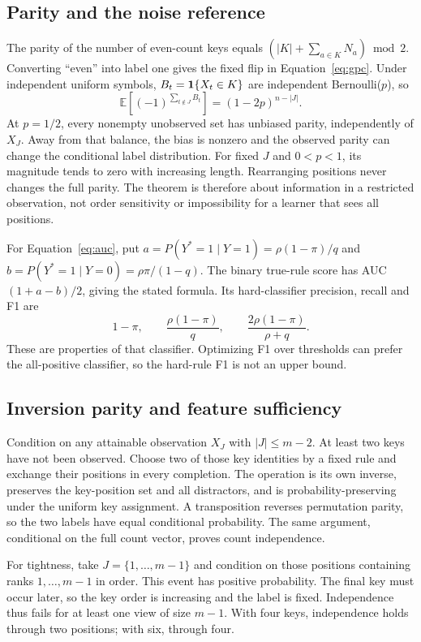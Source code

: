 \subsection{Parity and the noise reference}
The parity of the number of even-count keys equals $(|K|+\sum_{a\in K}N_a)\bmod2$. Converting ``even'' into label one gives the fixed flip in Equation~\ref{eq:gpc}. Under independent uniform symbols, $B_t=\mathbf{1}\{X_t\in K\}$ are independent Bernoulli($p$), so
\[
\mathbb E\!\left[(-1)^{\sum_{t\notin J}B_t}\right]=(1-2p)^{n-|J|}.
\]
At $p=1/2$, every nonempty unobserved set has unbiased parity, independently of $X_J$. Away from that balance, the bias is nonzero and the observed parity can change the conditional label distribution. For fixed $J$ and $0<p<1$, its magnitude tends to zero with increasing length. Rearranging positions never changes the full parity. The theorem is therefore about information in a restricted observation, not order sensitivity or impossibility for a learner that sees all positions.

For Equation~\ref{eq:auc}, put $a=P(Y^*=1\mid Y=1)=\rho(1-\pi)/q$ and $b=P(Y^*=1\mid Y=0)=\rho\pi/(1-q)$. The binary true-rule score has AUC $(1+a-b)/2$, giving the stated formula. Its hard-classifier precision, recall and F1 are
\[
1-\pi,\qquad \frac{\rho(1-\pi)}{q},\qquad \frac{2\rho(1-\pi)}{\rho+q}.
\]
These are properties of that classifier. Optimizing F1 over thresholds can prefer the all-positive classifier, so the hard-rule F1 is not an upper bound.

\subsection{Inversion parity and feature sufficiency}
Condition on any attainable observation $X_J$ with $|J|\leq m-2$. At least two keys have not been observed. Choose two of those key identities by a fixed rule and exchange their positions in every completion. The operation is its own inverse, preserves the key-position set and all distractors, and is probability-preserving under the uniform key assignment. A transposition reverses permutation parity, so the two labels have equal conditional probability. The same argument, conditional on the full count vector, proves count independence.

For tightness, take $J=\{1,\ldots,m-1\}$ and condition on those positions containing ranks $1,\ldots,m-1$ in order. This event has positive probability. The final key must occur later, so the key order is increasing and the label is fixed. Independence thus fails for at least one view of size $m-1$. With four keys, independence holds through two positions; with six, through four. \newres

